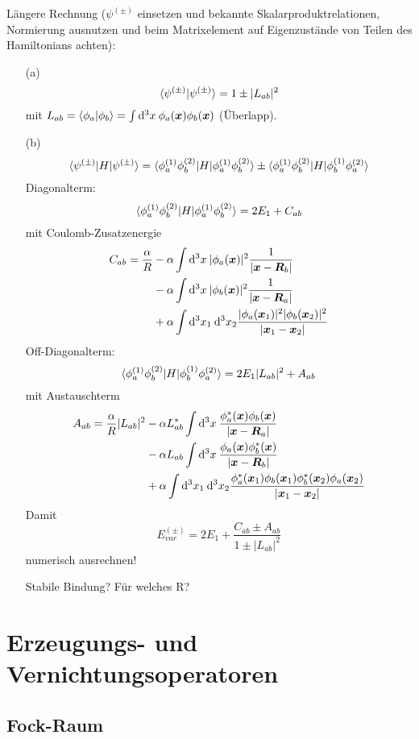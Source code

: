 \documentclass[11pt,a4paper]{report}
\renewcommand{\vec}{\boldsymbol}
\begin{document}
Längere Rechnung ($\psi^{(\pm )}$ einsetzen und bekannte Skalarproduktrelationen, Normierung ausnutzen und beim Matrixelement auf Eigenzustände von Teilen des Hamiltonians achten):
\begin{itemize}
\item[(a)] $$\langle \psi^{(\pm )} | \psi^{(\pm )} \rangle = 1\pm |L_{ab}|^2$$
mit $L_{ab}=\sprod{\phi_a}{\phi_b}=\int\dif^3x\:\phi_a(\vec{x})\phi_b(\vec{x})$ (Überlapp).
\item[(b)] $$\langle \psi^{(\pm )}|H|\psi^{(\pm )}\rangle = \langle \phi_a^{(1)}\phi_b^{(2)}|H|\phi_a^{(1)}\phi_b^{(2)}\rangle \pm \langle \phi_a^{(1)}\phi_b^{(2)}|H|\phi_b^{(1)}\phi_a^{(2)}\rangle$$
Diagonalterm:
$$\langle \phi_a^{(1)}\phi_b^{(2)}|H|\phi_a^{(1)}\phi_b^{(2)}\rangle=2E_1+C_{ab}$$
mit Coulomb-Zusatzenergie 
\begin{align*}
C_{ab}=\frac{\alpha}{R}&-\alpha\int\dif^3x\: |\phi_a(\vec{x})|^2\frac{1}{|\vec{x}-\vec{R}_b|} \\
&- \alpha\int\dif^3x\: |\phi_b(\vec{x})|^2\frac{1}{|\vec{x}-\vec{R}_a|} \\
&+\alpha\int\dif^3x_1\:\dif^3x_2\frac{|\phi_a(\vec{x}_1)|^2|\phi_b(\vec{x}_2)|^2}{|\vec{x}_1-\vec{x}_2|}
\end{align*}
Off-Diagonalterm:
$$\langle \phi_a^{(1)}\phi_b^{(2)}|H|\phi_b^{(1)}\phi_a^{(2)}\rangle= 2E_1|L_{ab}|^2+A_{ab}$$
mit Austauschterm
\begin{align*}
A_{ab}=\frac{\alpha}{R}|L_{ab}|^2 &-\alpha L_{ab}^*\int\dif^3x\: \frac{\phi^*_a(\vec{x})\phi_b(\vec{x})}{|\vec{x}-\vec{R}_a|} \\
&-\alpha L_{ab}\int\dif^3x\: \frac{\phi_a(\vec{x})\phi_b^*(\vec{x})}{|\vec{x}-\vec{R}_b|} \\
&+\alpha \int\dif^3x_1\:\dif^3x_2\frac{\phi_a^*(\vec{x}_1)\phi_b(\vec{x}_1)\phi_b^*(\vec{x}_2)\phi_a(\vec{x}_2)}{|\vec{x}_1-\vec{x}_2|}
\end{align*}
Damit
$$\boxed{E_{var}^{(\pm )}=2E_1 + \frac{C_{ab}\pm A_{ab}}{1\pm |L_{ab}|^2}}$$
numerisch ausrechnen!\par 
Stabile Bindung? Für welches R?


\end{itemize}

\section{Erzeugungs- und Vernichtungsoperatoren}

\subsection{Fock-Raum}
\end{document}
